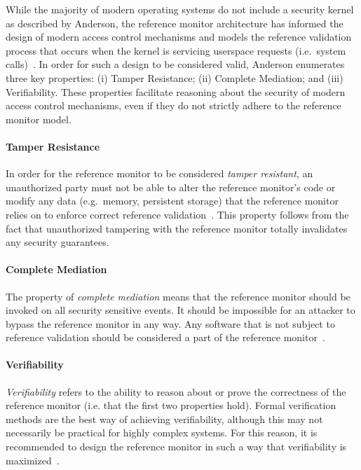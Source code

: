 While the majority of modern operating systems do not include a security kernel as
described by Anderson, the reference monitor architecture has informed the design of
modern access control mechanisms and models the reference validation process that occurs
when the kernel is servicing userspace requests (i.e.\ system
calls)~\cite{van_oorschot2020_tools_jewels}. In order for such a design to be considered
valid, Anderson enumerates three key properties: (i) Tamper Resistance; (ii) Complete
Mediation; and (iii) Verifiability. These properties facilitate reasoning about the
security of modern access control mechanisms, even if they do not strictly adhere to the
reference monitor model.

\paragraph*{Tamper Resistance}

In order for the reference monitor to be considered \textit{tamper resistant}, an unauthorized
party must not be able to alter the reference monitor's code or modify any data
(e.g.\ memory, persistent storage) that the reference monitor relies on to enforce correct
reference validation~\cite{anderson1972_report}. This property follows from the fact that
unauthorized tampering with the reference monitor totally invalidates any security
guarantees.

\paragraph*{Complete Mediation}

The property of \textit{complete mediation} means that the reference monitor should be
invoked on all security sensitive events. It should be impossible for an attacker to
bypass the reference monitor in any way. Any software that is not subject to reference
validation should be considered a part of the reference
monitor~\cite{anderson1972_report}.

\paragraph*{Verifiability}

\textit{Verifiability} refers to the ability to reason about or prove the correctness of
the reference monitor (i.e. that the first two properties hold). Formal verification methods
are the best way of achieving verifiability, although this may not necessarily be practical
for highly complex systems. For this reason, it is recommended to design the reference monitor
in such a way that verifiability is maximized~\cite{anderson1972_report}.

